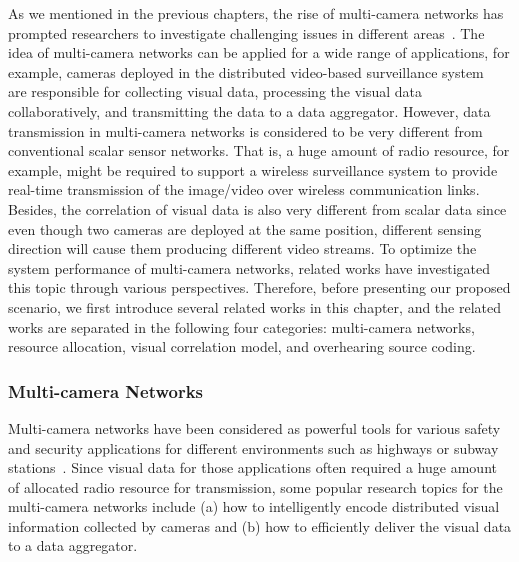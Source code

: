 As we mentioned in the previous chapters, the rise of multi-camera networks has prompted researchers to investigate challenging issues in different areas~\cite{VsnChallenges}.
The idea of multi-camera networks can be applied for a wide range of applications, for example, cameras deployed in the distributed video-based surveillance system~\cite{VideoBasedSurveillanceSystem} are responsible for collecting visual data, processing the visual data collaboratively, and transmitting the data to a data aggregator.
However, data transmission in multi-camera networks is considered to be very different from conventional scalar sensor networks.
That is, a huge amount of radio resource, for example, might be required to support a wireless surveillance system to provide real-time transmission of the image/video over wireless communication links.
Besides, the correlation of visual data is also very different from scalar data since even though two cameras are deployed at the same position, different sensing direction will cause them producing different video streams.
To optimize the system performance of multi-camera networks, related works have investigated this topic through various perspectives.
Therefore, before presenting our proposed scenario, we first introduce several related works in this chapter, and the related works are separated in the following four categories: multi-camera networks, resource allocation, visual correlation model, and overhearing source coding.
%
\subsubsection{Multi-camera Networks}
Multi-camera networks have been considered as powerful tools for various safety and security applications for different environments such as highways or subway stations~\cite{MultiCameraNetworksBook}.
Since visual data for those applications often required a huge amount of allocated radio resource for transmission, some popular research topics for the multi-camera networks include (a) how to intelligently encode distributed visual information collected by cameras and (b) how to efficiently deliver the visual data to a data aggregator.

